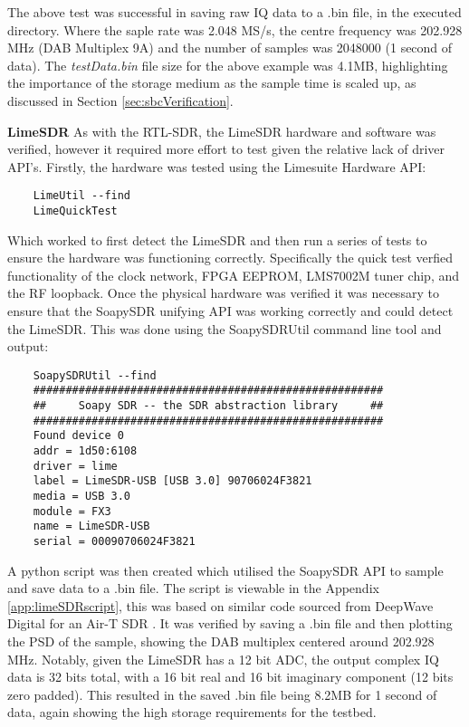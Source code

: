 \noindent
The above test was successful in saving raw IQ data to a .bin file, in the executed directory. Where the saple rate was 2.048 MS/s, the centre frequency was 202.928 MHz (DAB Multiplex 9A) and the number of samples was 2048000 (1 second of data). The \textit{testData.bin} file size for the above example was 4.1MB, highlighting the importance of the storage medium as the sample time is scaled up, as discussed in Section \ref{sec:sbcVerification}.   

\par \vspace{0.5cm}
\noindent
\textbf{LimeSDR}
As with the RTL-SDR, the LimeSDR hardware and software was verified, however it required more effort to test given the relative lack of driver API's. Firstly, the hardware was tested using the Limesuite Hardware API:
\begin{verbatim}
    LimeUtil --find
    LimeQuickTest
\end{verbatim}

\noindent
Which worked to first detect the LimeSDR and then run a series of tests to ensure the hardware was functioning correctly. Specifically the quick test verfied functionality of the clock network, FPGA EEPROM, LMS7002M tuner chip, and the RF loopback. Once the physical hardware was verified it was necessary to ensure that the SoapySDR unifying API was working correctly and could detect the LimeSDR. This was done using the SoapySDRUtil command line tool and output:

\begin{verbatim}
    SoapySDRUtil --find
    ######################################################
    ##     Soapy SDR -- the SDR abstraction library     ##
    ######################################################
    Found device 0
    addr = 1d50:6108
    driver = lime
    label = LimeSDR-USB [USB 3.0] 90706024F3821
    media = USB 3.0
    module = FX3
    name = LimeSDR-USB
    serial = 00090706024F3821
\end{verbatim}

\noindent A python script was then created which utilised the SoapySDR API to sample and save data to a .bin file. The script is viewable in the Appendix \ref{app:limeSDRscript}, this was based on similar code sourced from DeepWave Digital for an Air-T SDR \cite{complexSamplingPython}. It was verified by saving a .bin file and then plotting the PSD of the sample, showing the DAB multiplex centered around 202.928 MHz. Notably, given the LimeSDR has a 12 bit ADC, the output complex IQ data is 32 bits total, with a 16 bit real and 16 bit imaginary component (12 bits zero padded). This resulted in the saved .bin file being 8.2MB for 1 second of data, again showing the high storage requirements for the testbed.

